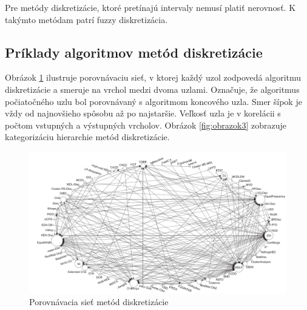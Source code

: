 Pre metódy diskretizácie, ktoré pretínajú intervaly nemusí platiť nerovnosť. K takýmto metódam patrí fuzzy diskretizácia. \cite{levashenkoProj}

\subsection{Príklady algoritmov metód diskretizácie}


Obrázok  \ref{fig:obrazok2} ilustruje porovnávaciu sieť, v ktorej každý uzol zodpovedá algoritmu diskretizácie a smeruje na vrchol medzi dvoma uzlami. Označuje, že algoritmus počiatočného uzlu bol porovnávaný s algoritmom koncového uzla. Smer šípok je vždy od najnovšieho spôsobu až po najstaršie. Veľkosť uzla je v korelácii s počtom vstupných a výstupných vrcholov. \cite{Garcia2013} Obrázok \ref{fig:obrazok3} zobrazuje kategorizáciu hierarchie metód diskretizácie. 

\begin{figure}
	\centering
	\includegraphics[width=1\linewidth]{obrazky/obrazok2}
	\caption{Porovnávacia sieť metód diskretizácie}
	\label{fig:obrazok2}
\end{figure}

